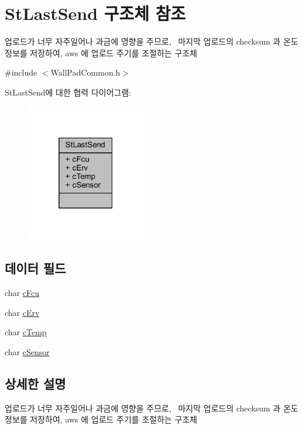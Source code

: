 \hypertarget{struct_st_last_send}{}\section{St\+Last\+Send 구조체 참조}
\label{struct_st_last_send}


업로드가 너무 자주일어나 과금에 영향을 주므로,~\newline
마지막 업로드의 checksum 과 온도정보를 저장하여, aws 에 업로드 주기를 조절하는 구조체  




{\ttfamily \#include $<$Wall\+Pad\+Common.\+h$>$}



St\+Last\+Send에 대한 협력 다이어그램\+:\nopagebreak
\begin{figure}[H]
\begin{center}
\leavevmode
\includegraphics[width=148pt]{struct_st_last_send__coll__graph}
\end{center}
\end{figure}
\subsection*{데이터 필드}
\begin{DoxyCompactItemize}
\item 
char \mbox{\hyperlink{struct_st_last_send_ae99178f09a1a9fed4ba8f4603f165d17}{c\+Fcu}}
\item 
char \mbox{\hyperlink{struct_st_last_send_a47a441ff5eafccfc6171e25c5ea0c311}{c\+Erv}}
\item 
char \mbox{\hyperlink{struct_st_last_send_a7ea4080d1f39154be7d7b1bfd6ff3987}{c\+Temp}}
\item 
char \mbox{\hyperlink{struct_st_last_send_adaef2dbbc191c190520eab895effe14a}{c\+Sensor}}
\end{DoxyCompactItemize}


\subsection{상세한 설명}
업로드가 너무 자주일어나 과금에 영향을 주므로,~\newline
마지막 업로드의 checksum 과 온도정보를 저장하여, aws 에 업로드 주기를 조절하는 구조체 

